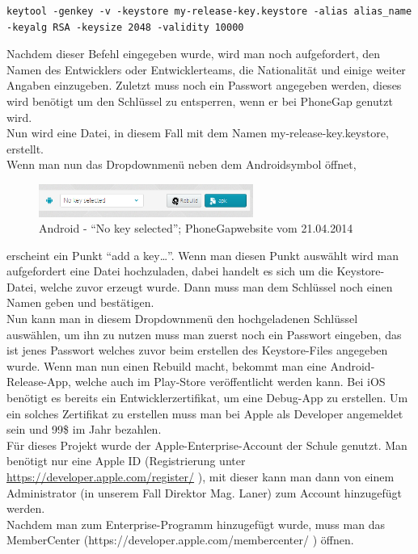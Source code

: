 \begin{lstlisting}
keytool -genkey -v -keystore my-release-key.keystore -alias alias_name -keyalg RSA -keysize 2048 -validity 10000
\end{lstlisting}

Nachdem dieser Befehl eingegeben wurde, wird man noch aufgefordert, den Namen des Entwicklers oder Entwicklerteams, die Nationalität und einige weiter Angaben einzugeben. Zuletzt muss noch ein Passwort angegeben werden, dieses wird benötigt um den Schlüssel zu entsperren, wenn er bei PhoneGap genutzt wird.\\
Nun wird eine Datei, in diesem Fall mit dem Namen my-release-key.keystore, erstellt.\\
Wenn man nun das Dropdownmenü neben dem Androidsymbol öffnet,\\

\begin{figure}[H]
\centering
\includegraphics[keepaspectratio=true, width=7cm]{images/phoneGap/PhoneGap3.png}
\caption{Android - \enquote{No key selected}; PhoneGapwebsite vom 21.04.2014}
\end{figure}

erscheint ein Punkt \enquote{add a key…}. Wenn man diesen Punkt auswählt wird man aufgefordert eine Datei hochzuladen, dabei handelt es sich um die Keystore-Datei, welche zuvor erzeugt wurde. Dann muss man dem Schlüssel noch einen Namen geben und bestätigen.\\
Nun kann man in diesem Dropdownmenü den hochgeladenen Schlüssel auswählen, um ihn zu nutzen muss man zuerst noch ein Passwort eingeben, das ist jenes Passwort welches zuvor beim erstellen des Keystore-Files angegeben wurde. Wenn man nun einen Rebuild macht, bekommt man eine Android-Release-App, welche auch im Play-Store veröffentlicht werden kann.
Bei iOS benötigt es bereits ein Entwicklerzertifikat, um eine Debug-App zu erstellen. Um ein solches Zertifikat zu erstellen muss man bei Apple als Developer angemeldet sein und 99\$ im Jahr bezahlen.\\
Für dieses Projekt wurde der Apple-Enterprise-Account der Schule genutzt. Man benötigt nur eine Apple ID (Registrierung unter \href{https://developer.apple.com/register/}{https://developer.apple.com/register/} ), mit dieser kann man dann von einem Administrator (in unserem Fall Direktor Mag. Laner) zum Account hinzugefügt werden.\\
Nachdem man zum Enterprise-Programm hinzugefügt wurde, muss man das MemberCenter (https://developer.apple.com/membercenter/ ) öffnen.\\

